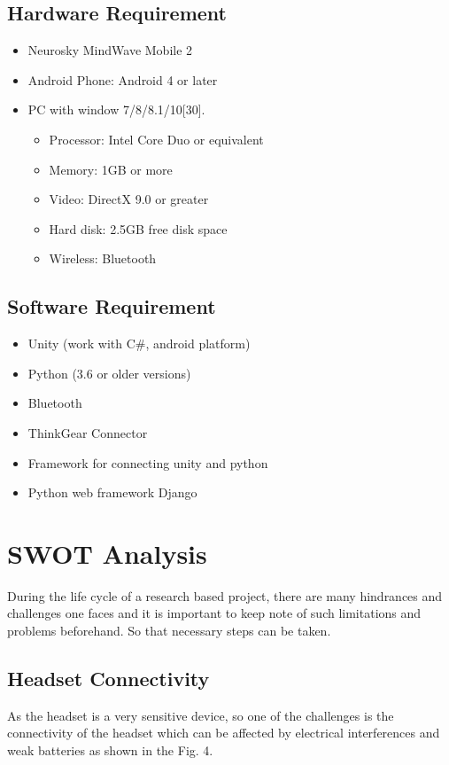 \documentclass[a4paper, 12pt, oneside]{uet_thesis}
\begin{document}
\section{Hardware Requirement}

\begin{itemize}
\item Neurosky MindWave Mobile 2
\item Android Phone: Android 4 or later
\item PC with window 7/8/8.1/10[30].
\begin{itemize}
     \item Processor: Intel Core Duo or equivalent
     \item Memory: 1GB or more
     \item Video: DirectX 9.0 or greater
     \item Hard disk: 2.5GB free disk space
     \item Wireless: Bluetooth
\end{itemize}
\end{itemize}

\section{Software Requirement}
\begin{itemize}
\item Unity (work with C\#, android platform)
\item Python (3.6 or older versions)
\item Bluetooth
\item ThinkGear Connector
\item Framework for connecting unity and python
\item Python web framework Django
\end{itemize}


\newpage
\chapter{SWOT Analysis}

During the life cycle of a research based project, there are many hindrances and challenges one faces and it is important to keep note of such limitations and problems beforehand. So that necessary steps can be taken.

\section{Headset Connectivity}
As the headset is a very sensitive device, so one of the challenges is the connectivity of the headset which can be affected by electrical interferences and weak batteries as shown in the Fig. 4\cite{b31}.
\end{document}
